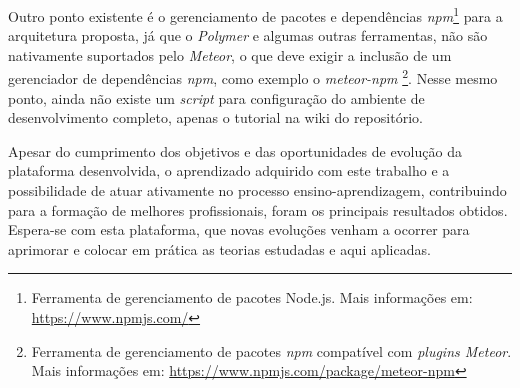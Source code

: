 Outro ponto existente é o gerenciamento de pacotes e dependências \textit{npm}\footnote{Ferramenta de gerenciamento de pacotes Node.js. Mais informações em: \url{https://www.npmjs.com/}} para a arquitetura proposta, já que o \textit{Polymer} e algumas outras ferramentas, não são nativamente suportados pelo \textit{Meteor}, o que deve exigir a inclusão de um gerenciador de dependências \textit{npm}, como exemplo o \textit{meteor-npm} \footnote{Ferramenta de gerenciamento de pacotes \textit{npm} compatível com \textit{plugins Meteor}. Mais informações em: \url{https://www.npmjs.com/package/meteor-npm}}. Nesse mesmo ponto, ainda não existe um \textit{script} para configuração do ambiente de desenvolvimento completo, apenas o tutorial na wiki do repositório. 

Apesar do cumprimento dos objetivos e das oportunidades de evolução da plataforma desenvolvida, o aprendizado adquirido com este trabalho e a possibilidade de atuar ativamente no processo ensino-aprendizagem, contribuindo para a formação de melhores profissionais, foram os principais resultados obtidos. Espera-se com esta plataforma, que novas evoluções venham a ocorrer para aprimorar e colocar em prática as teorias estudadas e aqui aplicadas.
